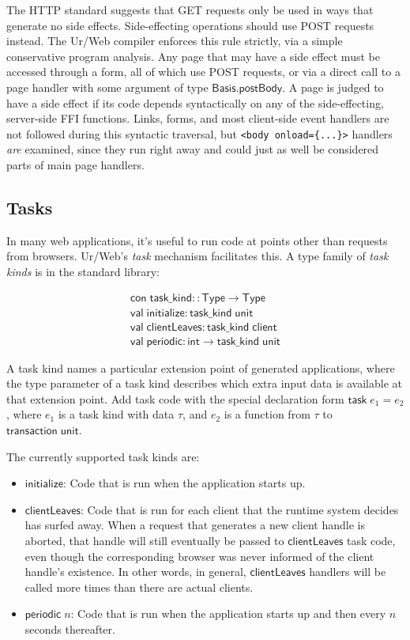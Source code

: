 \documentclass{article}
\newcommand{\mt}[1]{\mathsf{#1}}
\begin{document}
\medskip

The HTTP standard suggests that GET requests only be used in ways that generate no side effects.  Side-effecting operations should use POST requests instead.  The Ur/Web compiler enforces this rule strictly, via a simple conservative program analysis.  Any page that may have a side effect must be accessed through a form, all of which use POST requests, or via a direct call to a page handler with some argument of type $\mt{Basis.postBody}$.  A page is judged to have a side effect if its code depends syntactically on any of the side-effecting, server-side FFI functions.  Links, forms, and most client-side event handlers are not followed during this syntactic traversal, but \texttt{<body onload=\{...\}>} handlers \emph{are} examined, since they run right away and could just as well be considered parts of main page handlers.

\subsection{Tasks}

In many web applications, it's useful to run code at points other than requests from browsers.  Ur/Web's \emph{task} mechanism facilitates this.  A type family of \emph{task kinds} is in the standard library:

$$\begin{array}{l}
\mt{con} \; \mt{task\_kind} :: \mt{Type} \to \mt{Type} \\
\mt{val} \; \mt{initialize} : \mt{task\_kind} \; \mt{unit} \\
\mt{val} \; \mt{clientLeaves} : \mt{task\_kind} \; \mt{client} \\
\mt{val} \; \mt{periodic} : \mt{int} \to \mt{task\_kind} \; \mt{unit}
\end{array}$$

A task kind names a particular extension point of generated applications, where the type parameter of a task kind describes which extra input data is available at that extension point.  Add task code with the special declaration form $\mt{task} \; e_1 = e_2$, where $e_1$ is a task kind with data $\tau$, and $e_2$ is a function from $\tau$ to $\mt{transaction} \; \mt{unit}$.

The currently supported task kinds are:
\begin{itemize}
\item $\mt{initialize}$: Code that is run when the application starts up.
\item $\mt{clientLeaves}$: Code that is run for each client that the runtime system decides has surfed away.  When a request that generates a new client handle is aborted, that handle will still eventually be passed to $\mt{clientLeaves}$ task code, even though the corresponding browser was never informed of the client handle's existence.  In other words, in general, $\mt{clientLeaves}$ handlers will be called more times than there are actual clients.
\item $\mt{periodic} \; n$: Code that is run when the application starts up and then every $n$ seconds thereafter.
\end{itemize}
\end{document}
